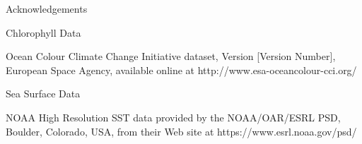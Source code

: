 Acknowledgements 

Chlorophyll Data

Ocean Colour Climate Change Initiative dataset, Version [Version Number], European Space
Agency, available online at http://www.esa-oceancolour-cci.org/

Sea Surface Data

NOAA High Resolution SST data provided by the NOAA/OAR/ESRL PSD, Boulder, Colorado, USA, from their Web site at https://www.esrl.noaa.gov/psd/